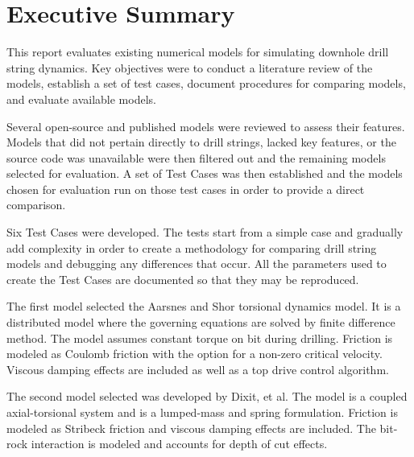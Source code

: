 \chapter*{Executive Summary}

This report evaluates existing numerical models for simulating downhole drill string dynamics.  Key objectives were to conduct a literature review of the models, establish a set of test cases, document procedures for comparing models, and evaluate available models.

Several open-source and published models were reviewed to assess their features.  Models that did not pertain directly to drill strings, lacked key features, or the source code was unavailable were then filtered out and the remaining models selected for evaluation.  A set of Test Cases was then established and the models chosen for evaluation run on those test cases in order to provide a direct comparison.

Six Test Cases were developed.  The tests start from a simple case and gradually add complexity in order to create a methodology for comparing drill string models and debugging any differences that occur.  All the parameters used to create the Test Cases are documented so that they may be reproduced.

The first model selected the Aarsnes and Shor torsional dynamics model.  It is a distributed model where the governing equations are solved by finite difference method. The model assumes constant torque on bit during drilling.  Friction is modeled as Coulomb friction with the option for a non-zero critical velocity.  Viscous damping effects are included as well as a top drive control algorithm.

The second model selected was developed by Dixit, et al. The model is a coupled axial-torsional system and is a lumped-mass and spring formulation.  Friction is modeled as Stribeck friction and viscous damping effects are included.  The bit-rock interaction is modeled and accounts for depth of cut effects.


